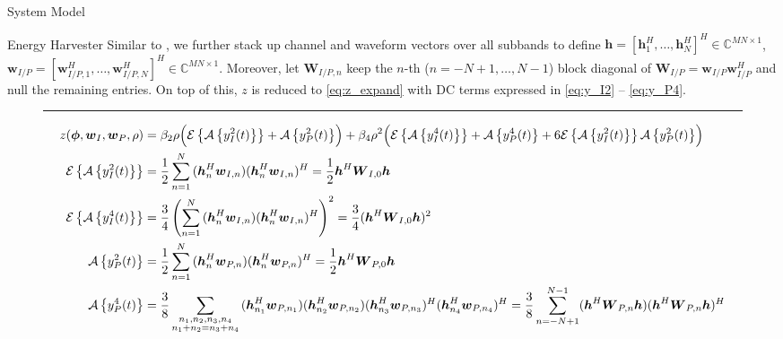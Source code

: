 \documentclass[journal]{IEEEtran}
\begin{document}
\begin{section}{System Model}
\begin{subsection}{Energy Harvester}
		Similar to \cite{Huang2017}, we further stack up channel and waveform vectors over all subbands to define $\boldsymbol{h}=[\boldsymbol{h}_1^H,\dots,\boldsymbol{h}_N^H]^H \in \mathbb{C}^{MN \times 1}$, $\boldsymbol{w}_{I/P}=[\boldsymbol{w}_{I/P,1}^H,\dots,\boldsymbol{w}_{I/P,N}^H]^H \in \mathbb{C}^{MN \times 1}$. Moreover, let $\boldsymbol{W}_{I/P,n}$ keep the $n$-th ($n=-N+1,\dots,N-1$) block diagonal of $\boldsymbol{W}_{I/P}=\boldsymbol{w}_{I/P}\boldsymbol{w}_{I/P}^H$ and null the remaining entries. On top of this, $z$ is reduced to \ref{eq:z_expand} with DC terms expressed in \ref{eq:y_I2} -- \ref{eq:y_P4}.
		\begin{figure*}[b]
			\hrule
			\begin{align}
				z(\boldsymbol{\phi},\boldsymbol{w}_I,\boldsymbol{w}_P,\rho)
				& = \beta_2\rho\Bigl(\mathcal{E}\left\{\mathcal{A}\left\{y_{I}^2(t)\right\}\right\}+\mathcal{A}\left\{y_{P}^2(t)\right\}\Bigr)+\beta_4\rho^2\Bigl(\mathcal{E}\left\{\mathcal{A}\left\{y_{I}^4(t)\right\}\right\}+\mathcal{A}\left\{y_{P}^4(t)\right\}+6\mathcal{E}\left\{\mathcal{A}\left\{y_{I}^2(t)\right\}\right\}\mathcal{A}\left\{y_{P}^2(t)\right\}\Bigr)\label{eq:z_expand}\\
				\mathcal{E}\left\{\mathcal{A}\left\{y_{I}^2(t)\right\}\right\}
				& = \frac{1}{2}\sum_{n=1}^N{(\boldsymbol{h}_{n}^H\boldsymbol{w}_{I,n})(\boldsymbol{h}_{n}^H\boldsymbol{w}_{I,n})^H} = \frac{1}{2}\boldsymbol{h}^H\boldsymbol{W}_{I,0}\boldsymbol{h}\label{eq:y_I2}\\
				\mathcal{E}\left\{\mathcal{A}\left\{y_{I}^4(t)\right\}\right\}
				& = \frac{3}{4}\left(\sum_{n=1}^N{(\boldsymbol{h}_{n}^H\boldsymbol{w}_{I,n})(\boldsymbol{h}_{n}^H\boldsymbol{w}_{I,n})^H}\right)^2 = \frac{3}{4}(\boldsymbol{h}^H\boldsymbol{W}_{I,0}\boldsymbol{h})^2\label{eq:y_I4}\\
				\mathcal{A}\left\{y_{P}^2(t)\right\}
				& = \frac{1}{2}\sum_{n=1}^N{(\boldsymbol{h}_{n}^H\boldsymbol{w}_{P,n})(\boldsymbol{h}_{n}^H\boldsymbol{w}_{P,n})^H} = \frac{1}{2}\boldsymbol{h}^H\boldsymbol{W}_{P,0}\boldsymbol{h}\label{eq:y_P2}\\
				\mathcal{A}\left\{y_{P}^4(t)\right\}
				& = \frac{3}{8}\sum_{\substack{{n_1},{n_2},{n_3},{n_4}\\{n_1}+{n_2}={n_3}+{n_4}}}{(\boldsymbol{h}_{{n_1}}^H\boldsymbol{w}_{P,{n_1}})(\boldsymbol{h}_{{n_2}}^H\boldsymbol{w}_{P,{n_2}})(\boldsymbol{h}_{{n_3}}^H\boldsymbol{w}_{P,{n_3}})^H(\boldsymbol{h}_{{n_4}}^H\boldsymbol{w}_{P,{n_4}})^H} = \frac{3}{8}\sum_{n=-N+1}^{N-1}(\boldsymbol{h}^H\boldsymbol{W}_{P,n}\boldsymbol{h})(\boldsymbol{h}^H\boldsymbol{W}_{P,n}\boldsymbol{h})^H\label{eq:y_P4}
			\end{align}
		\end{figure*}
	\end{subsection}


\end{section}
\end{document}
